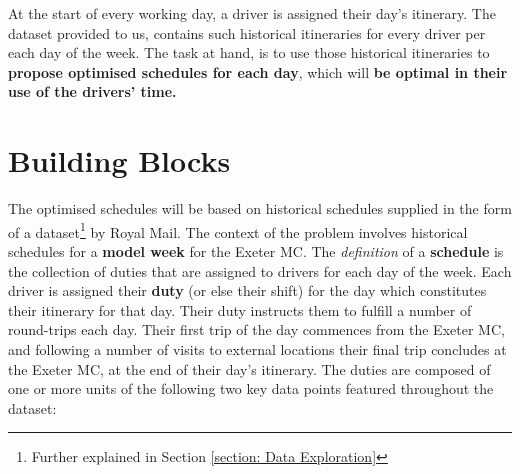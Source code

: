 \vspace{\baselineskip}
\noindent
At the start of every working day, a driver is assigned their day's itinerary. The dataset provided to us, contains such historical itineraries for every driver per each day of the week. The task at hand, is to use those historical itineraries to \textbf{propose optimised schedules for each day}, which will \textbf{be optimal in their use of the drivers' time.}


\section{Building Blocks}
\label{section: Input Parameters}
The optimised schedules will be based on historical schedules supplied in the form of a dataset\footnote{Further explained in Section \ref{section: Data Exploration}} by Royal Mail. The context of the problem involves historical schedules for a \textbf{model week} for the Exeter MC. The \textit{definition} of a \textbf{schedule} is the collection of duties that are assigned to drivers for each day of the week. Each driver is assigned their \textbf{duty} (or else their shift) for the day which constitutes their itinerary for that day. Their duty instructs them to fulfill a number of round-trips each day. Their first trip of the day commences from the Exeter MC, and following a number of visits to external locations their final trip concludes at the Exeter MC, at the end of their day's itinerary. The duties are composed of one or more units of the following two key data points featured throughout the dataset:


